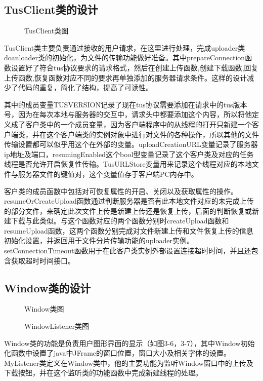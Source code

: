 \documentclass[bachelor]{thesis-uestc}
\begin{document}
\subsection{TusClient类的设计}
\begin{figure}[h]
\caption{TusClient类图}
\end{figure}
TusClient类主要负责通过接收的用户请求，在这里进行处理，完成uploader类doanloader类的初始化，为文件的传输功能做好准备。其中prepareConnection函数设置好了符合tus协议要求的请求格式，然后在创建上传函数,创建下载函数,回复上传函数,恢复函数对应不同的要求再单独添加的服务器请求条件。这样的设计减少了代码的重复，简化了结构，提高了可读性。
\par 其中的成员变量TUSVERSION记录了现在tus协议需要添加在请求中的tus版本号，因为在每次本地与服务器的交互中，请求头中都要添加这个内容，所以将他定义成了客户类中的一个成员变量，因为客户端程序中的从线程的打开只新建一个客户端类，并在这个客户端类的实例对象中进行对文件的各种操作，所以其他的文件传输设置都可以似乎用这个在外部的变量。uploadCreationURL变量记录了服务器ip地址及端口，resumingEnabled这个bool型变量记录了这个客户类及对应的任务线程是否允许开启恢复性传输。TusURLStore变量用来记录这个线程对应的本地文件与服务器文件的键值对，这个变量值存于客户端PC内存中。
\par 客户类的成员函数中包括对可恢复属性的开启、关闭以及获取属性的操作。resumeOrCreateUpload函数通过判断服务器是否有此本地文件对应的未完成上传的部分文件，来确定此次文件上传是新建上传还是恢复上传，后面的判断恢复或新建下载与此类似。与这个函数对应的两个函数分别时createUpload函数和resumeUpload函数，这两个函数分别完成对文件新建上传和文件恢复上传的信息初始化设置，并返回用于文件分片传输功能的uploader实例。setConnectionTimeout函数用于在此客户类实例外部设置连接超时时间，并且还包含获取超时时间接口。

\subsection{Window类的设计}
\begin{figure}[h]
\caption{Window类图}
\end{figure}

\begin{figure}[h]
\caption{WindowListener类图}
\end{figure}
Window类的功能是负责用户图形界面的显示（如图3-6，3-7），其中Window初始化函数中设置了java中JFrame的窗口位置，窗口大小及相关字体的设置。MyListener类定义在Window类中，他的主要功能为监听Window窗口中的上传及下载按钮，并在这个监听类的功能函数中完成新建线程的处理。
\end{document}
